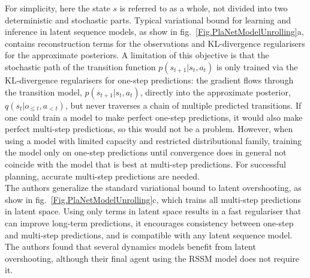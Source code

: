 For simplicity, here the state $s$ is referred to as a whole, not divided into two deterministic and stochastic parts. Typical variational bound for learning and inference in latent sequence models, as show in fig.~\ref{Fig.PlaNetModelUnrolling}a, contains reconstruction terms for the observations and KL-divergence regularisers for the approximate posteriors. A limitation of this objective is that the stochastic path of the transition function $p(s_{t+1} | s_t, a_t)$ is only trained via the KL-divergence regularisers for one-step predictions: the gradient flows through the transition model, $p(s_{t+1} | s_t, a_t)$, directly into the approximate posterior, $q(s_t | o_{\leqslant t}, a_{< t})$, but never traverses a chain of multiple predicted transitions. If one could train a model to make perfect one-step predictions, it would also make perfect multi-step predictions, so this would not be a problem. However, when using a model with limited capacity and restricted distributional family, training the model only on one-step predictions until convergence does in general not coincide with the model that is best at multi-step predictions. For successful planning, accurate multi-step predictions are needed. \\
The authors generalize the standard variational bound to latent overshooting, as show in fig.~\ref{Fig.PlaNetModelUnrolling}c, which trains all multi-step predictions in latent space. Using only terms in latent space results in a fast regulariser that can improve long-term predictions, it encourages consistency between one-step and multi-step predictions, and is compatible with any latent sequence model. \\
The authors found that several dynamics models benefit from latent overshooting, although their final agent using the RSSM model does not require it.

